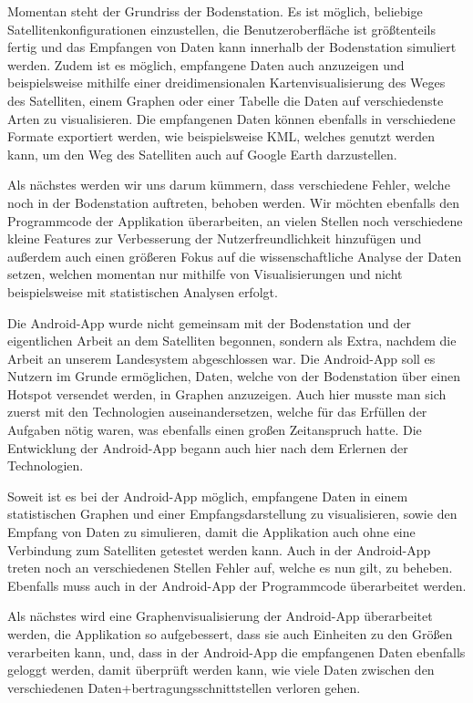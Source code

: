 Momentan steht der Grundriss der Bodenstation. Es ist möglich, beliebige Satellitenkonfigurationen einzustellen, die Benutzeroberfläche ist größtenteils fertig und das Empfangen von Daten kann innerhalb der Bodenstation simuliert werden. Zudem ist es möglich, empfangene Daten auch anzuzeigen und beispielsweise mithilfe einer dreidimensionalen Kartenvisualisierung des Weges des Satelliten, einem Graphen oder einer Tabelle die Daten auf verschiedenste Arten zu visualisieren. Die empfangenen Daten können ebenfalls in verschiedene Formate exportiert werden, wie beispielsweise KML, welches genutzt werden kann, um den Weg des Satelliten auch auf Google Earth darzustellen.

Als nächstes werden wir uns darum kümmern, dass verschiedene Fehler, welche noch in der Bodenstation auftreten, behoben werden. Wir möchten ebenfalls den Programmcode der Applikation überarbeiten, an vielen Stellen noch verschiedene kleine Features zur Verbesserung der Nutzerfreundlichkeit hinzufügen und außerdem auch einen größeren Fokus auf die wissenschaftliche Analyse der Daten setzen, welchen momentan nur mithilfe von Visualisierungen und nicht beispielsweise mit statistischen Analysen erfolgt.

Die Android-App wurde nicht gemeinsam mit der Bodenstation und der eigentlichen Arbeit an dem Satelliten begonnen, sondern als Extra, nachdem die Arbeit an unserem Landesystem abgeschlossen war. Die Android-App soll es Nutzern im Grunde ermöglichen, Daten, welche von der Bodenstation über einen Hotspot versendet werden, in Graphen anzuzeigen. Auch hier musste man sich zuerst mit den Technologien auseinandersetzen, welche für das Erfüllen der Aufgaben nötig waren, was ebenfalls einen großen Zeitanspruch hatte. Die Entwicklung der Android-App begann auch hier nach dem Erlernen der Technologien.

Soweit ist es bei der Android-App möglich, empfangene Daten in einem statistischen Graphen und einer Empfangsdarstellung zu visualisieren, sowie den Empfang von Daten zu simulieren, damit die Applikation auch ohne eine Verbindung zum Satelliten getestet werden kann. Auch in der Android-App treten noch an verschiedenen Stellen Fehler auf, welche es nun gilt, zu beheben. Ebenfalls muss auch in der Android-App der Programmcode überarbeitet werden.

Als nächstes wird eine Graphenvisualisierung der Android-App überarbeitet werden, die Applikation so aufgebessert, dass sie auch Einheiten zu den Größen verarbeiten kann, und, dass in der Android-App die empfangenen Daten ebenfalls geloggt werden, damit überprüft werden kann, wie viele Daten zwischen den verschiedenen Daten+bertragungsschnittstellen verloren gehen.